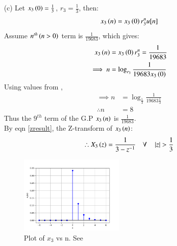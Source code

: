\documentclass[journal,12pt,twocolumn]{IEEEtran}
\theoremstyle{remark}
\begin{document}
(c) Let $x_3\left(0\right) = \frac{1}{3}$, $r_3 = \frac{1}{3}$, then:
\begin{align}
    x_3\left(n\right) = x_3\left(0\right) r_3^nu[n]
\end{align}
Assume $n^{th}\left(n > 0\right)$ term is $\frac{1}{19683}$, which gives: 
\begin{align}
    x_3\left(n\right) &= x_3\left(0\right) r_3^n = \frac{1}{19683}\\
    \implies n &= \log_{r_3}{\frac{1}{19683 x_3\left(0\right)}}
\end{align}
Using values from ,
\begin{align}
    \implies n &= \log_{\frac{1}{3}}{\frac{1}{19683 \frac{1}{3}}}\\
    \therefore n &= 8
\end{align}
Thus the $9^{th}$ term of the G.P $x_3\left(n\right)$ is $\frac{1}{19683}$.\\
By eqn \ref{zresult}, the Z-transform of $x_3\left(n\right)$:
\begin{align}
    \therefore X_3\left(z\right) = \frac{1}{3 - z^{-1}} \quad \forall \quad \left\vert z\right\vert > \frac{1}{3}
\end{align}

\begin{figure}[h!]
    \renewcommand\thefigure{3}
    \centering
    \includegraphics[width=0.45\textwidth]{figs/c.png}
    \caption[short]{Plot of $x_3$ vs n. See }
    \label{fig:img3}
\end{figure}


\end{document}
